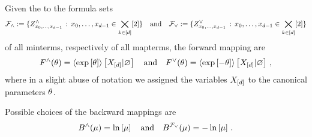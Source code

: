 \begin{theorem}
    Given the \MarkovLogicNetworks{} to the formula sets
    \[ \mathcal{F}_{\land} := \{ Z^{\land}_{{x_{0},\ldots,x_{d-1}}} \, : \, {x_{0},\ldots,x_{d-1}}\in\bigtimes_{k\in[d]}[2]\} \quad \text{and} \quad
    \mathcal{F}_{\lor} := \{ Z^{\lor}_{{x_{0},\ldots,x_{d-1}}} \, : \, {x_{0},\ldots,x_{d-1}}\in\bigtimes_{k\in[d]}[2]\}  \]
    of all minterms, respectively of all mapterms, the forward mapping are
    \[ F^{\land}(\theta) = \left\langle \mathrm{exp}\left[\theta\right]\right\rangle \left[ X_{[d]} | \varnothing \right]
    \quad \text{and} \quad
    F^{\lor}(\theta) = \left\langle \mathrm{exp}\left[-\theta\right]\right\rangle \left[ X_{[d]} | \varnothing \right] \, , \]
    where in a slight abuse of notation we assigned the variables $X_{[d]}$ to the canonical parameters $\theta$.

    Possible choices of the backward mappings are
    \[ B^{\land}(\mu) = \ln \left[ \mu \right]
    \quad \text{and} \quad
    B^{\mathcal{F}_{\lor}}(\mu) = -\ln \left[ \mu \right] \, .
    \]
\end{theorem}
